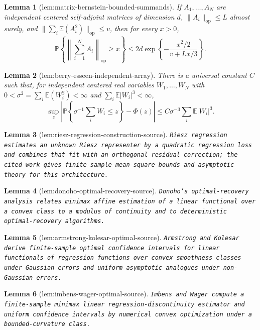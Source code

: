 \documentclass{article}
\newtheorem{lemma}{Lemma}
\begin{document}
\begin{lemma}[lem:matrix-bernstein-bounded-summands]\label{lem:matrix-bernstein-bounded-summands}
If \(A_1,\ldots,A_N\) are independent centered self-adjoint matrices of dimension \(d\), \(\|A_i\|_{\mathrm{op}}\le L\) almost surely, and \(\|\sum_i\mathbb E(A_i^2)\|_{\mathrm{op}}\le v\), then for every \(x>0\),
\[
\mathbb P\left\{\left\|\sum_{i=1}^NA_i\right\|_{\mathrm{op}}\ge x\right\}
\le2d\exp\left\{-\frac{x^2/2}{v+Lx/3}\right\}.
\]
\end{lemma}

\begin{lemma}[lem:berry-esseen-independent-array]\label{lem:berry-esseen-independent-array}
There is a universal constant \(C\) such that, for independent centered real variables \(W_1,\ldots,W_N\) with \(0<\sigma^2=\sum_i\mathbb E(W_i^2)<\infty\) and \(\sum_i\mathbb E|W_i|^3<\infty\),
\[
\sup_z\left|\mathbb P\left\{\sigma^{-1}\sum_iW_i\le z\right\}-\Phi(z)\right|
\le C\sigma^{-3}\sum_i\mathbb E|W_i|^3.
\]
\end{lemma}

\begin{lemma}[lem:riesz-regression-construction-source]\label{lem:riesz-regression-construction-source}
\texttt{Riesz regression estimates an unknown Riesz representer by a quadratic regression loss and combines that fit with an orthogonal residual correction;\allowbreak{} the cited work gives finite-\allowbreak{}sample mean-\allowbreak{}square bounds and asymptotic theory for this architecture.}
\end{lemma}

\begin{lemma}[lem:donoho-optimal-recovery-source]\label{lem:donoho-optimal-recovery-source}
\texttt{Donoho's optimal-\allowbreak{}recovery analysis relates minimax affine estimation of a linear functional over a convex class to a modulus of continuity and to deterministic optimal-\allowbreak{}recovery algorithms.}
\end{lemma}

\begin{lemma}[lem:armstrong-kolesar-optimal-source]\label{lem:armstrong-kolesar-optimal-source}
\texttt{Armstrong and Kolesar derive finite-\allowbreak{}sample optimal confidence intervals for linear functionals of regression functions over convex smoothness classes under Gaussian errors and uniform asymptotic analogues under non-\allowbreak{}Gaussian errors.}
\end{lemma}

\begin{lemma}[lem:imbens-wager-optimal-source]\label{lem:imbens-wager-optimal-source}
\texttt{Imbens and Wager compute a finite-\allowbreak{}sample minimax linear regression-\allowbreak{}discontinuity estimator and uniform confidence intervals by numerical convex optimization under a bounded-\allowbreak{}curvature class.}
\end{lemma}
\end{document}
